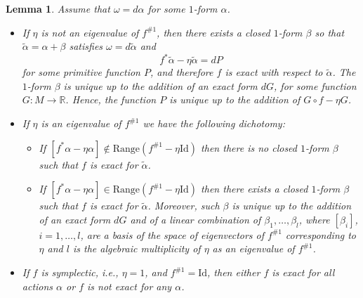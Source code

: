 \documentclass[11pt]{amsart}
\newtheorem{lem}[thm]{Lemma}
\theoremstyle{definition}
\theoremstyle{remark}
\numberwithin{equation}{section}
\begin{document}
\begin{lem}\label{generating2}
  Assume that
  $\omega = d\alpha$ for some $1$-form $\alpha$.
  \begin{itemize}
  \item [(i)] If $\eta$ is not an eigenvalue of $f^{\#1}$, then  there exists a closed $1$-form $\beta$
  so that $\tilde \alpha = \alpha + \beta$
  satisfies $\omega = d \tilde \alpha$ and
  \begin{equation}\label{newgauge}
  f^* {\tilde \alpha} -\eta {\tilde \alpha} = d P
  \end{equation}
  for some primitive function $P$, and therefore $f$ is exact with respect to $\tilde\alpha$.
  The $1$-form $\beta$  is unique up to
  the addition of an exact form $dG$,  for some function $G:M\to\mathbb{R}$.
  Hence, the function $P$ is unique up to the addition of
  $G \circ f - \eta G$.

  \item[(ii)] If $\eta$ is an eigenvalue of $f^{\#1}$ we have the following dichotomy:
  \begin{itemize}
  \item[(ii.a)] If $[f^*\alpha-\eta\alpha]\not \in \textrm{Range}(f^{\#1}-\eta\textrm{Id})$ then there  is no closed $1$-form $\beta$ such that $f$ is exact for $\tilde\alpha$.
  \item[(ii.b)] If $[f^*\alpha-\eta\alpha]\in \textrm{Range}(f^{\#1}-\eta\textrm{Id})$ then there exists a closed $1$-form $\beta$ such that $f$  is exact for $\tilde\alpha$. Moreover, such $ \beta $ is unique up to   the addition  of   an exact form
$dG$  and of a linear combination of
    $\beta_1,\ldots,\beta_l$, where $[\beta_i]$, $i=1,\ldots,l$, are
    a basis of the space of eigenvectors of $f^{\#1}$  corresponding to  $\eta$  and  $l$ is the algebraic multiplicity of $\eta$
    as an eigenvalue of $f^{\#1}$.
  \end{itemize}

\item [(iii)] If $f$ is symplectic, i.e., $\eta=1$, and $f^{\#1}=\textrm{Id}$, then either $f$ is exact for all actions $\alpha$ or $f$  is not exact
  for any $\alpha$.
  \end{itemize}
\end{lem}
\end{document}
